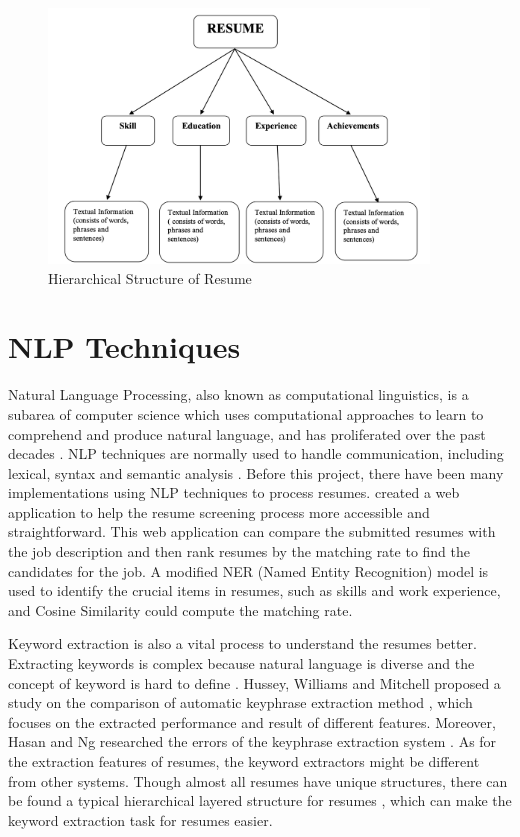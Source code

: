  \begin{figure}[H]
    \centering
    \includegraphics[width=0.9\textwidth]{images/resume_structure.png}
    \caption{Hierarchical Structure of Resume \cite{kudatarkar2015survey}}
    \label{fig:2}
\end{figure}



\section{NLP Techniques}

Natural Language Processing, also known as computational linguistics, is a subarea of computer science which uses computational approaches to learn to comprehend and produce natural language, and has proliferated over the past decades \cite{hirschberg2015advances}. NLP techniques are normally used to handle communication, including lexical, syntax and semantic analysis \cite{alamelu2021resume}. Before this project, there have been many implementations using NLP techniques to process resumes. \cite{alamelu2021resume} created a web application to help the resume screening process more accessible and straightforward. This web application can compare the submitted resumes with the job description and then rank resumes by the matching rate to find the candidates for the job. A modified NER (Named Entity Recognition) model is used to identify the crucial items in resumes, such as skills and work experience, and Cosine Similarity could compute the matching rate. 

Keyword extraction is also a vital process to understand the resumes better. Extracting keywords is complex because natural language is diverse and the concept of keyword is hard to define \cite{firoozeh2020keyword}. Hussey, Williams and Mitchell proposed a study on the comparison of automatic keyphrase extraction method \cite{hussey2012automatic}, which focuses on the extracted performance and result of different features. Moreover, Hasan and Ng researched the errors of the keyphrase extraction system \cite{hasan2014automatic}. As for the extraction features of resumes, the keyword extractors might be different from other systems. Though almost all resumes have unique structures, there can be found a typical hierarchical layered structure for resumes \cite{finn2004multi}, which can make the keyword extraction task for resumes easier. 

